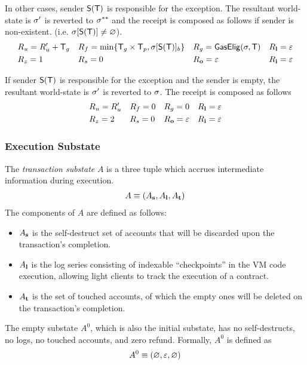 In other cases, sender $\mathsf{S}{\left({\textsf{T}} \right)}$ is responsible for the exception. The resultant world-state is $\mathbf{\sigma}'$ is reverted to $\mathbf{\sigma}^{**}$ and the receipt is composed as follows if sender is non-existent. (i.e. $\mathbf{\sigma}[\mathsf{S}{\left({\textsf{T}} \right)}]\neq\varnothing$).
\begin{align}
	&R_u=R'_u+\textsf{T}_g && R_f=\min\{\textsf{T}_g\times\textsf{T}_p,\mathbf{\sigma}[\mathsf{S}{\left({\textsf{T}} \right)}]_b\} && R_g=\mathsf{GasElig}(\mathbf{\sigma},\textsf{T}) && R_{\bf l}=\mathbb{\varepsilon} \\
	&R_z=1 && R_s=0 && R_{\bf o}=\mathbb{\varepsilon} && R_{\bf i}=\mathbb{\varepsilon}
\end{align}

If sender $\mathsf{S}{\left({\textsf{T}} \right)}$ is responsible for the exception and the sender is empty, the resultant world-state is $\mathbf{\sigma}'$ is reverted to $\mathbf{\sigma}$. The receipt is composed as follows
\begin{align}
	&R_u=R'_u && R_f=0 && R_g=0 && R_{\bf l}=\mathbb{\varepsilon} \\
	&R_z=2 && R_s=0 && R_{\bf o}=\mathbb{\varepsilon} && R_{\bf i}=\mathbb{\varepsilon}
\end{align}


\subsubsection{Execution Substate}
\label{subsubsec:substate}

The \emph{transaction substate} $A$ is a three tuple which accrues intermediate information during execution. 
\begin{align}
	A\equiv \left( A_{\bf s}, A_{\bf l}, A_{\bf t}\right)
\end{align}
The components of $A$ are defined as follows: 
\begin{itemize}[nosep]
	\item $A_{\bf s}$ is the self-destruct set of accounts that will be discarded upon the transaction's completion.

	\item $A_{\bf l}$ is the log series consisting of indexable ``checkpoints'' in the VM code execution, allowing light clients to track the execution of a contract.

	\item $A_{\bf t}$ is the set of touched accounts, of which the empty ones will be deleted on the transaction's completion.
\end{itemize}

The empty substate $A^0$, which is also the initial substate, has no self-destructs, no logs, no touched accounts, and zero refund. Formally, $A^0$ is defined as
\begin{align}
	A^0\equiv \left( \varnothing, \mathbb{\varepsilon}, \varnothing\right)
\end{align}

